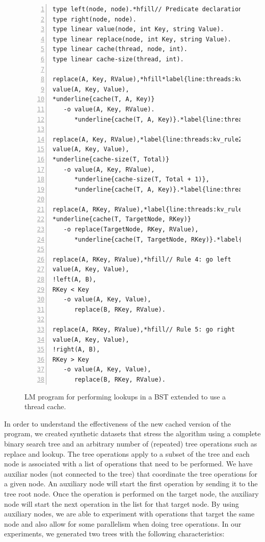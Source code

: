 \begin{figure}[ht]
\begin{Verbatim}[numbers=left,fontsize=\codesize,commandchars=*\{\}]
type left(node, node).*hfill// Predicate declaration
type right(node, node).
type linear value(node, int Key, string Value).
type linear replace(node, int Key, string Value).
type linear cache(thread, node, int).
type linear cache-size(thread, int).

replace(A, Key, RValue),*hfill*label{line:threads:kv_rule1_start}// Rule 1: key exists and is also in the cache
value(A, Key, Value),
*underline{cache(T, A, Key)}
   -o value(A, Key, RValue).
      *underline{cache(T, A, Key)}.*label{line:threads:kv_rule1_end}

replace(A, Key, RValue),*label{line:threads:kv_rule2_start}*hfill// Rule 2: key exists and is not in the cache
value(A, Key, Value),
*underline{cache-size(T, Total)}
   -o value(A, Key, RValue),
      *underline{cache-size(T, Total + 1)},
      *underline{cache(T, A, Key)}.*label{line:threads:kv_rule2_end}

replace(A, RKey, RValue),*label{line:threads:kv_rule3_start}*hfill// Rule 3: cached by the thread
*underline{cache(T, TargetNode, RKey)}
   -o replace(TargetNode, RKey, RValue),
      *underline{cache(T, TargetNode, RKey)}.*label{line:threads:kv_rule3_end}

replace(A, RKey, RValue),*hfill// Rule 4: go left
value(A, Key, Value),
!left(A, B),
RKey < Key
   -o value(A, Key, Value),
      replace(B, RKey, RValue).

replace(A, RKey, RValue),*hfill// Rule 5: go right
value(A, Key, Value),
!right(A, B),
RKey > Key
   -o value(A, Key, Value),
      replace(B, RKey, RValue).
\end{Verbatim}
\caption{LM program for performing lookups in a BST extended to use a thread cache.}
\label{code:threads:btree_lookup_cache}
\end{figure}

In order to understand the effectiveness of the new cached version of the
program, we created synthetic datasets that stress the algorithm using a
complete binary search tree and an arbitrary number of (repeated) tree
operations such as replace and lookup. The tree operations apply to a subset of
the tree and each node is associated with a list of operations that need to be
performed. We have auxiliar nodes (not connected to the tree) that coordinate
the tree operations for a given node. An auxiliary node will start the first
operation by sending it to the tree root node. Once the operation is performed
on the target node, the auxiliary node will start the next operation in the list
for that target node. By using auxiliary nodes, we are able to experiment with
operations that target the same node and also allow for some parallelism when
doing tree operations. In our experiments, we generated two trees with the
following characteristics:


